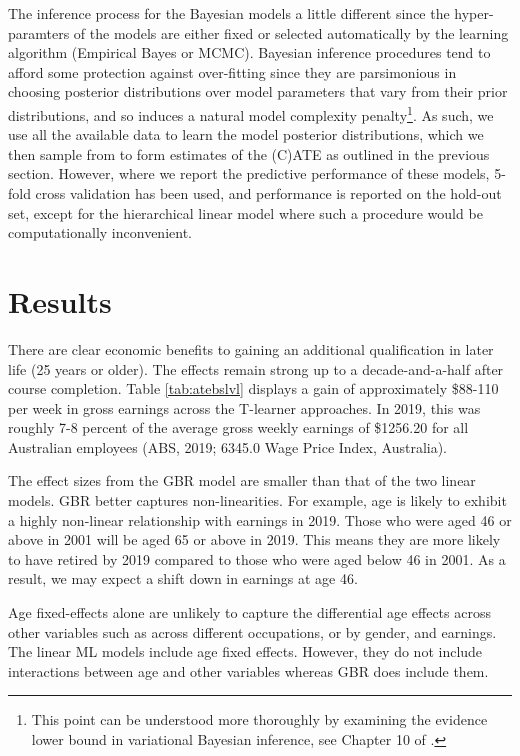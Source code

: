\documentclass[12pt, a4paper]{article}
\begin{document}
The inference process for the Bayesian models a little different since the
hyper-paramters of the models are either fixed or selected automatically by the
learning algorithm (Empirical Bayes or MCMC). Bayesian inference procedures
tend to afford some protection against over-fitting since they are parsimonious
in choosing posterior distributions over model parameters that vary from their
prior distributions, and so induces a natural model complexity
penalty\footnote{This point can be understood more thoroughly by examining the
evidence lower bound in variational Bayesian inference, see Chapter 10 of
\citet{bishop2006}.}. As such, we use all the available data to learn the model
posterior distributions, which we then sample from to form estimates of the
(C)ATE as outlined in the previous section. However, where we report the
predictive performance of these models, 5-fold cross validation has been used,
and performance is reported on the hold-out set, except for the hierarchical
linear model where such a procedure would be computationally inconvenient.


\section{Results}

There are clear economic benefits to gaining an additional qualification in later life (25 years or older). The effects remain strong up to a decade-and-a-half after course completion. Table \ref{tab:atebslvl} displays a gain of approximately \$88-110 per week in gross earnings across the T-learner approaches. In 2019, this was roughly 7-8 percent of the average gross weekly earnings of \$1256.20 for all Australian employees (ABS, 2019; 6345.0 Wage Price Index, Australia). 

The effect sizes from the GBR model are smaller than that of the two linear models. GBR better captures non-linearities. For example, age is likely to exhibit a highly non-linear relationship with earnings in 2019. Those who were aged 46 or above in 2001 will be aged 65 or above in 2019. This means they are more likely to have retired by 2019 compared to those who were aged below 46 in 2001. As a result, we may expect a shift down in earnings at age 46. 

Age fixed-effects alone are unlikely to capture the differential age effects across other variables such as across different occupations, or by gender, and earnings. The linear ML models include age fixed effects. However, they do not include interactions between age and  other variables whereas GBR does include them.
\end{document}

